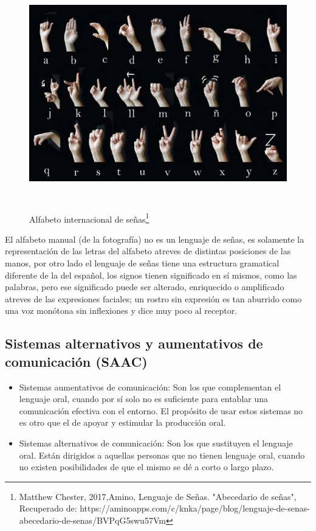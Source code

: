 \documentclass[12pt]{report}%
\begin{document}
\begin{figure}[H]
\centering
	 \includegraphics[width=14cm, height=10cm]{ABC.jpg}
	 \caption[Alfabeto internacional de señas]{Alfabeto internacional de señas\footnote{Matthew Chester, 2017,Amino, Lenguaje de Señas. "Abecedario de señas", Recuperado de: https://aminoapps.com/c/knka/page/blog/lenguaje-de-senas-abecedario-de-senas/BVPqG5swu57Vm}}%
	 	 \label{fig:alfabeto}
\end{figure}

El alfabeto manual (de la fotografía) no es un lenguaje de señas, es solamente la representación de las letras del alfabeto atreves de distintas posiciones de las manos, por otro lado el lenguaje de señas tiene una estructura gramatical diferente de la del español, los signos tienen significado en sí mismos, como las palabras, pero ese significado puede ser alterado, enriquecido o  amplificado atreves de las expresiones faciales; un rostro sin expresión es tan aburrido como una voz monótona sin inflexiones y dice muy poco al receptor.

\subsection{Sistemas alternativos y aumentativos de comunicación (SAAC)}
\begin{itemize}
\item Sistemas aumentativos de comunicación: Son los que complementan el lenguaje oral, cuando por sí solo no es suficiente para entablar una comunicación efectiva con el entorno. El propósito de usar estos sistemas no es otro que el de apoyar y estimular la producción oral.
\item Sistemas alternativos de comunicación: Son los que sustituyen el lenguaje oral. Están dirigidos a aquellas personas que no tienen lenguaje oral, cuando no existen posibilidades de que el mismo se dé a corto o largo plazo.
\end{itemize}
\end{document}
